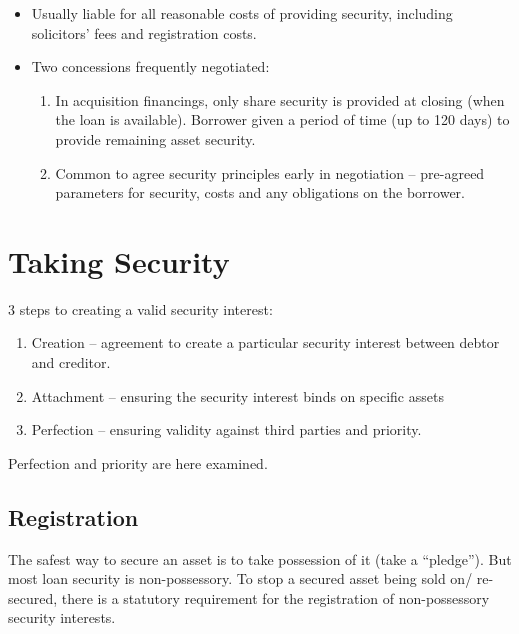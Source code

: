 \documentclass[
]{article}
\providecommand{\tightlist}{%
  \setlength{\itemsep}{0pt}\setlength{\parskip}{0pt}}
\begin{document}
\begin{itemize}
\tightlist
\item
  Usually liable for all reasonable costs of providing security,
  including solicitors' fees and registration costs.
\item
  Two concessions frequently negotiated:

  \begin{enumerate}
  \tightlist
  \item
    In acquisition financings, only share security is provided at
    closing (when the loan is available). Borrower given a period of
    time (up to 120 days) to provide remaining asset security.
  \item
    Common to agree security principles early in negotiation --
    pre-agreed parameters for security, costs and any obligations on the
    borrower.
  \end{enumerate}
\end{itemize}

\hypertarget{taking-security}{%
\section{Taking Security}\label{taking-security}}

3 steps to creating a valid security interest:

\begin{enumerate}
\tightlist
\item
  Creation -- agreement to create a particular security interest between
  debtor and creditor.
\item
  Attachment -- ensuring the security interest binds on specific assets
\item
  Perfection -- ensuring validity against third parties and priority.
\end{enumerate}

Perfection and priority are here examined.

\hypertarget{registration}{%
\subsection{Registration}\label{registration}}

The safest way to secure an asset is to take possession of it (take a
``pledge''). But most loan security is non-possessory. To stop a secured
asset being sold on/ re-secured, there is a statutory requirement for
the registration of non-possessory security interests.
\end{document}
